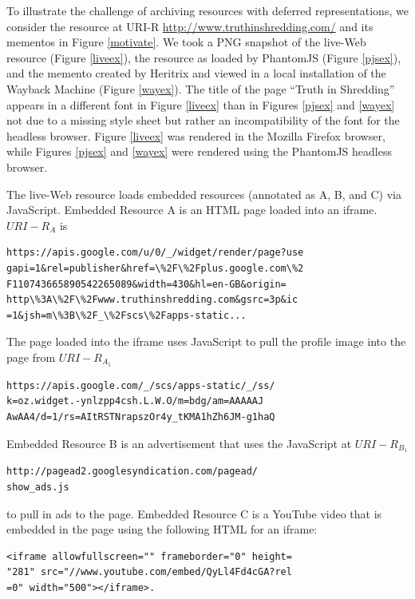 \documentclass{ipres_proc_article-sp}
\begin{document}
To illustrate the challenge of archiving resources with deferred representations, we consider the resource at URI-R \url{http://www.truthinshredding.com/} and its mementos in Figure \ref{motivate}. We took a PNG snapshot of the live-Web resource (Figure \ref{liveex}), the resource as loaded by PhantomJS (Figure \ref{pjsex}), and the memento created by Heritrix and viewed in a local installation of the Wayback Machine (Figure \ref{wayex}). The title of the page ``Truth in Shredding'' appears in a different font in Figure \ref{liveex} than in Figures \ref{pjsex} and \ref{wayex} not due to a missing style sheet but rather an incompatibility of the font for the headless browser. Figure \ref{liveex} was rendered in the Mozilla Firefox browser, while Figures \ref{pjsex} and \ref{wayex} were rendered using the PhantomJS headless browser.

The live-Web resource loads embedded resources (annotated as A, B, and C) via JavaScript. Embedded Resource A is an HTML page loaded into an iframe. $URI-R_A$ is
\vskip -3mm
\begin{verbatim}
https://apis.google.com/u/0/_/widget/render/page?use
gapi=1&rel=publisher&href=\%2F\%2Fplus.google.com\%2
F110743665890542265089&width=430&hl=en-GB&origin=
http\%3A\%2F\%2Fwww.truthinshredding.com&gsrc=3p&ic
=1&jsh=m\%3B\%2F_\%2Fscs\%2Fapps-static...
\end{verbatim}
\vskip -3mm
The page loaded into the iframe uses JavaScript to pull the profile image into the page from $URI-R_{A_1}$ 
\vskip -3mm
\begin{verbatim}
https://apis.google.com/_/scs/apps-static/_/ss/
k=oz.widget.-ynlzpp4csh.L.W.O/m=bdg/am=AAAAAJ
AwAA4/d=1/rs=AItRSTNrapszOr4y_tKMA1hZh6JM-g1haQ
\end{verbatim}
\vskip -3mm
Embedded Resource B is an advertisement that uses the JavaScript at $URI-R_{B_1}$ 
\vskip -3mm
\begin{verbatim}
http://pagead2.googlesyndication.com/pagead/
show_ads.js
\end{verbatim}
\vskip -3mm
to pull in ads to the page. Embedded Resource C is a YouTube video that is embedded in the page using the following HTML for an iframe:
\vskip -3mm
 
\begin{verbatim}
<iframe allowfullscreen="" frameborder="0" height=
"281" src="//www.youtube.com/embed/QyLl4Fd4cGA?rel
=0" width="500"></iframe>.
\end{verbatim}
\vskip -3mm
\end{document}
